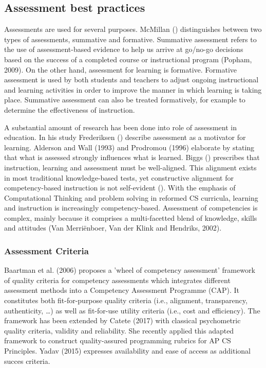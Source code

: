 \subsection{Assessment best practices}


Assessments are used for several purposes. McMillan (\cite{mcmillan2007formative}) distinguishes between two types of assessments, summative and formative. Summative assessment refers to the use of assessment-based evidence to help us arrive at go/no-go decisions based on the success of a completed course or instructional program (Popham, 2009). On the other hand, assessment for learning is formative. Formative assessment is used by both students and teachers to adjust ongoing instructional and learning activities in order to improve the manner in which learning is taking place. Summative assessment can also be treated formatively, for example to determine the effectiveness of instruction.




A substantial amount of research has been done into role of assessment in education. In his study Frederiksen (\cite{frederiksen1984}) describe assessment as a motivator for learning. Alderson and Wall (1993) and Prodromou (1996) elaborate by stating that what is assessed strongly influences what is learned. Biggs (\cite{biggs1996}) prescribes that instruction, learning and assessment must be well-aligned. This alignment exists in most traditional knowledge-based tests, yet constructive alignment for competency-based instruction is not self-evident (\cite{baartman2006wheel}). With the emphasis of Computational Thinking and problem solving in reformed CS curricula, learning and instruction is increasingly competency-based. Assessment of competencies is complex, mainly because it comprises a multi-facetted blend of knowledge, skills and attitudes (Van Merriënboer, Van der Klink and Hendriks, 2002).

\subsubsection*{Assessment Criteria}\label{sec:qualityCriteria}
Baartman et al. (2006) proposes a 'wheel of competency assessment' framework of quality criteria for competency assessments which integrates different assessment methods into a Competency Assessment Programme (CAP). It constitutes both fit-for-purpose quality criteria (i.e., alignment, transparency, authenticity, \ldots) as well as fit-for-use utility criteria (i.e., cost and efficiency). The framework has been extended by Catete (2017) with classical psychometric quality criteria, validity and reliability. She recently applied this adapted framework to construct quality-assured programming rubrics for AP CS Principles. Yadav (2015) expresses availability and ease of access as additional succes criteria.




